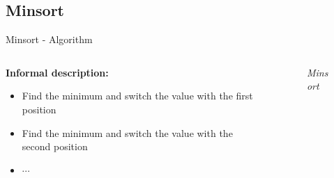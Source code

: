 \subsection{Minsort}

\begin{frame}{Minsort - Algorithm}
  \begin{columns}
    \begin{column}{0.5\textwidth}
      \textbf{Informal description:}
      \begin{itemize}
        \item
          Find the minimum and switch the value with the
          {\color{Mittel-Blau}first} position
        \item
          Find the minimum and switch the value with the
          {\color{Mittel-Blau}second} position
        \item
          $\cdots$
      \end{itemize}
    \end{column}
    \begin{column}{0.5\textwidth}
      \begin{figure}[!h]%
        \begin{adjustbox}{width=\linewidth}
        \end{adjustbox}
        \caption{\textit{Minsort}}%
        \label{fig:minsort_fourth_iteration}%
      \end{figure}%
    \end{column}
  \end{columns}
\end{frame}





